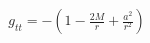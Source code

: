 \documentclass[preview]{standalone}
\begin{document}
\begin{align*}
g_{tt} = -\left(1-\frac{2M}{r}+\frac{a^2}{r^2}\right)
\end{align*}
\end{document}

